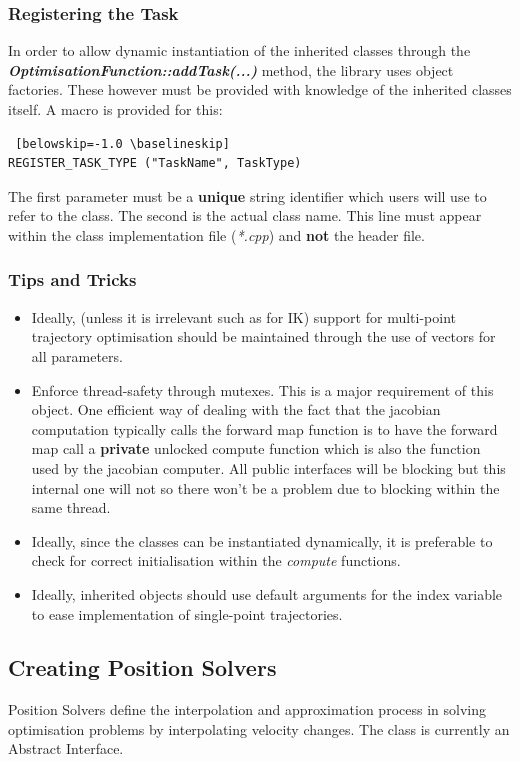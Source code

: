 \documentclass[12pt,a4paper,onecolumn]{article}
\begin{document}
\subsubsection*{Registering the Task}
In order to allow dynamic instantiation of the inherited classes through the \textbf{\textit{OptimisationFunction::addTask(...)}} method, the library uses object factories. These however must be provided with knowledge of the inherited classes itself. A macro is provided for this:
\begin{lstlisting} [belowskip=-1.0 \baselineskip]
REGISTER_TASK_TYPE ("TaskName", TaskType) 
\end{lstlisting}
The first parameter must be a \textbf{unique} string identifier which users will use to refer to the class. The second is the actual class name. This line must appear within the class implementation file (\textit{*.cpp}) and \textbf{not} the header file.
\subsubsection*{Tips and Tricks}
\begin{itemize}
\item Ideally, (unless it is irrelevant such as for IK) support for multi-point trajectory optimisation should be maintained through the use of vectors for all parameters.
\item Enforce thread-safety through mutexes. This is a major requirement of this object. One efficient way of dealing with the fact that the jacobian computation typically calls the forward map function is to have the forward map call a \textbf{private} unlocked compute function which is also the function used by the jacobian computer. All public interfaces will be blocking but this internal one will not so there won't be a problem due to blocking within the same thread.
\item Ideally, since the classes can be instantiated dynamically, it is preferable to check for correct initialisation within the \textit{compute} functions.
\item Ideally, inherited objects should use default arguments for the index variable to ease implementation of single-point trajectories.
\end{itemize}

\subsection{Creating Position Solvers}
Position Solvers define the interpolation and approximation process in solving optimisation problems by interpolating velocity changes. The class is currently an Abstract Interface.
\end{document}
